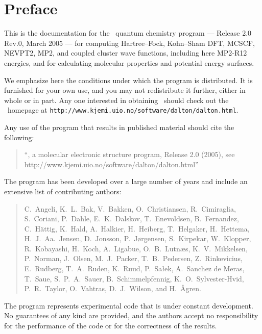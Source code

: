 \tableofcontents

\chapter*{Preface}

This is the documentation for the \dalton\ quantum chemistry program
--- Release 2.0 Rev.0, March 2005 --- for computing Hartree--Fock, Kohn--Sham DFT, 
MCSCF, NEVPT2,  MP2, and coupled cluster wave functions, including here MP2-R12 energies, and for calculating 
molecular properties and potential energy surfaces.

          We emphasize here the conditions under which the
program is distributed.  It is furnished for your own use,
and you may not redistribute it further, either in whole or in
part.  Any one interested in obtaining \dalton\ should check out the
\dalton\ homepage at
\verb|http://www.kjemi.uio.no/software/dalton/dalton.html|.

Any use of the program that results in published
material should cite the following:
\begin{quote}
``\dalton , a molecular electronic  structure program, Release
2.0 (2005), see http://www.kjemi.uio.no/software/dalton/dalton.html''
\end{quote}

The program has been developed over a large number of years and
include an extensive list of contributing authors:

\begin{quote}\raggedright
C.~Angeli,
K.~L.~Bak,
V.~Bakken,
O.~Christiansen,
R.~Cimiraglia,
S.~Coriani,
P.~Dahle,
E.~K.~Dalskov,
T.~Enevoldsen,
B.~Fernandez,
C.~H{\"a}ttig,
K.~Hald,
A.~Halkier,
H.~Heiberg,
T.~Helgaker,
H.~Hettema,
H.~J.~Aa.~Jensen,
D.~Jonsson,
P.~J{\o}rgensen,
S.~Kirpekar,
W.~Klopper,
R.~Kobayashi,
H.~Koch,
A.~Ligabue,
O.~B.~Lutn\ae s,
K.~V.~Mikkelsen,
P.~Norman,
J.~Olsen,
M.~J.~Packer,
T.~B.~Pedersen,
Z.~Rinkevicius,
E.~Rudberg,
T.~A.~Ruden,
K.~Ruud,
P.~Sa\l ek,
A.~Sanchez de Meras,
T.~Saue,
S.~P.~A.~Sauer,
B.~Schimmelpfennig,
K.~O.~Sylvester-Hvid,
P.~R.~Taylor,
O.~Vahtras,
D.~J.~Wilson,
and H.~{\AA}gren.
\end{quote}

          The program represents experimental code that is
under constant development.  No guarantees of any kind are
provided, and the authors accept no responsibility for the
performance of the code or for the correctness of the results.
